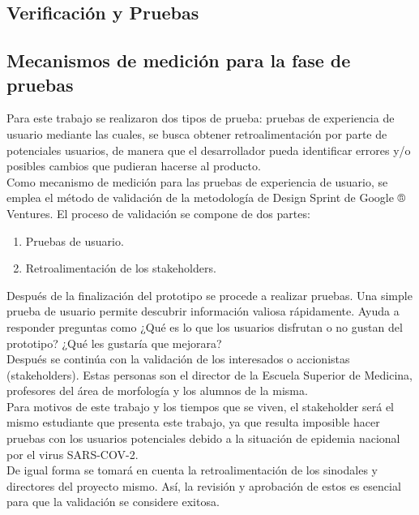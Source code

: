 \begin{center}
\chapter{Verificación y Pruebas}
\end{center}
\newpage

\section{Mecanismos de medición para la fase de pruebas}
Para este trabajo se realizaron dos tipos de prueba: pruebas de experiencia de usuario mediante las cuales, se busca obtener retroalimentación por parte de potenciales usuarios, de manera que el desarrollador pueda identificar errores y/o posibles cambios que pudieran hacerse al producto. \\

Como mecanismo de medición para las pruebas de experiencia de usuario, se emplea el método de validación de la metodología de Design Sprint de Google ® Ventures\cite{web16}. El proceso de validación se compone de dos partes:\\
\begin{enumerate}
    \item Pruebas de usuario.
    \item Retroalimentación de los stakeholders.
\end{enumerate}
Después de la finalización del prototipo se procede a realizar pruebas. Una simple prueba de usuario permite descubrir información valiosa rápidamente. Ayuda a responder preguntas como ¿Qué es lo que los usuarios disfrutan o no gustan del prototipo? ¿Qué les gustaría que mejorara? \\

Después se continúa con la validación de los interesados o accionistas (stakeholders). Estas personas son el director de la Escuela Superior de Medicina, profesores del área de morfología y los alumnos de la misma. \\

Para motivos de este trabajo y los tiempos que se viven, el stakeholder será el mismo estudiante que presenta este trabajo, ya que resulta imposible hacer pruebas con los usuarios potenciales debido a la situación de epidemia nacional por el virus SARS-COV-2.\\

De igual forma se tomará en cuenta la retroalimentación de los sinodales y directores del proyecto mismo. Así, la revisión y aprobación de estos es esencial para que la validación se considere exitosa.\\

